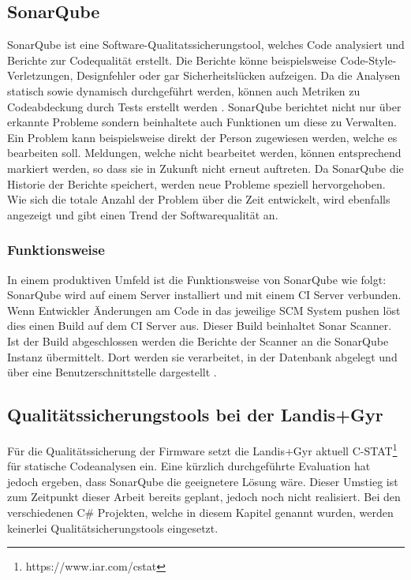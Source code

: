 \subsection{SonarQube}\label{quality:sonar}
SonarQube ist eine Software-Qualitatssicherungstool, welches Code analysiert und Berichte zur Codequalität erstellt.
Die Berichte könne beispielsweise Code-Style-Verletzungen, Designfehler oder gar Sicherheitslücken aufzeigen.
Da die Analysen statisch sowie dynamisch durchgeführt werden, können auch Metriken zu Codeabdeckung durch Tests erstellt werden \parencite{malloy_2021}.
SonarQube berichtet nicht nur über erkannte Probleme sondern beinhaltete auch Funktionen um diese zu Verwalten.
Ein Problem kann beispielsweise direkt der Person zugewiesen werden, welche es bearbeiten soll.
Meldungen, welche nicht bearbeitet werden, können entsprechend markiert werden, so dass sie in Zukunft nicht erneut auftreten.
Da SonarQube die Historie der Berichte speichert, werden neue Probleme speziell hervorgehoben.
Wie sich die totale Anzahl der Problem über die Zeit entwickelt, wird ebenfalls angezeigt und gibt einen Trend der Softwarequalität an.


\subsubsection{Funktionsweise}\label{sonar:funktionsweise}
In einem produktiven Umfeld ist die Funktionsweise von SonarQube wie folgt:
SonarQube wird auf einem Server installiert und mit einem \ac{CI} Server verbunden.
Wenn Entwickler Änderungen am Code in das jeweilige \ac{SCM} System pushen löst dies einen Build auf dem \ac{CI} Server aus.
Dieser Build beinhaltet Sonar Scanner.
Ist der Build abgeschlossen werden die Berichte der Scanner an die SonarQube Instanz übermittelt.
Dort werden sie verarbeitet, in der Datenbank abgelegt und über eine Benutzerschnittstelle dargestellt \parencite{malloy_2021}.

\subsection{Qualitätssicherungstools bei der Landis+Gyr}
Für die Qualitätssicherung der Firmware setzt die Landis+Gyr aktuell C-STAT\footnote{https://www.iar.com/cstat} für statische Codeanalysen ein.
Eine kürzlich durchgeführte Evaluation hat jedoch ergeben, dass SonarQube die geeignetere Lösung wäre.
Dieser Umstieg ist zum Zeitpunkt dieser Arbeit bereits geplant, jedoch noch nicht realisiert.
Bei den verschiedenen C\# Projekten, welche in diesem Kapitel genannt wurden, werden keinerlei Qualitätsicherungstools eingesetzt.
